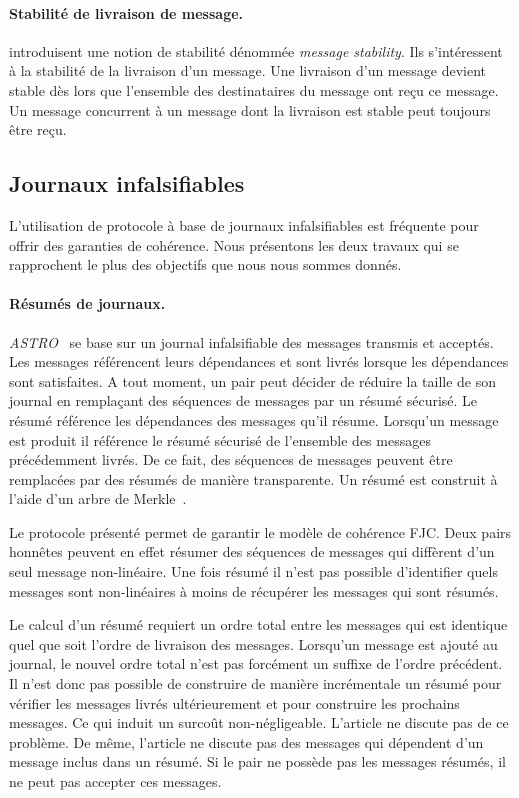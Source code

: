 \paragraph{Stabilité de livraison de message.} \textcite{birman_1991_causalmulticast} introduisent une notion de stabilité dénommée \emph{message stability}.
Ils s'intéressent à la stabilité de  la livraison d'un message.
Une livraison d'un message devient stable dès lors que l'ensemble des destinataires du message ont reçu ce message.
Un message concurrent à un message dont la livraison est stable peut toujours être reçu.


\subsection{Journaux infalsifiables}

L'utilisation de protocole à base de journaux infalsifiables est fréquente pour offrir des garanties de cohérence.
Nous présentons les deux travaux qui se rapprochent le plus des objectifs que nous nous sommes donnés.

\paragraph{Résumés de journaux.} \emph{ASTRO}~\autocite{mahajan_astro_2008} se base sur un journal infalsifiable des messages transmis et acceptés.
Les messages référencent leurs dépendances et sont livrés lorsque les dépendances sont satisfaites.
A tout moment, un pair peut décider de réduire la taille de son journal en remplaçant des séquences de messages par un résumé sécurisé.
Le résumé référence les dépendances des messages qu'il résume.
Lorsqu'un message est produit il référence le résumé sécurisé de l'ensemble des messages précédemment livrés.
De ce fait, des séquences de messages peuvent être remplacées par des résumés de manière transparente.
Un résumé est construit à l'aide d'un arbre de Merkle~\autocite{merkle_1979_merkletree}.

Le protocole présenté permet de garantir le modèle de cohérence \acf{FJC}.
Deux pairs honnêtes peuvent en effet résumer des séquences de messages qui diffèrent d'un seul message non-linéaire.
Une fois résumé il n'est pas possible d'identifier quels messages sont non-linéaires à moins de récupérer les messages qui sont résumés.

Le calcul d'un résumé requiert un ordre total entre les messages qui est identique quel que soit l'ordre de livraison des messages.
Lorsqu'un message est ajouté au journal, le nouvel ordre total n'est pas forcément un suffixe de l'ordre précédent.
Il n'est donc pas possible de construire de manière incrémentale un résumé pour vérifier les messages livrés ultérieurement et pour construire les prochains messages.
Ce qui induit un surcoût non-négligeable.
L'article ne discute pas de ce problème.
De même, l'article ne discute pas des messages qui dépendent d'un message inclus dans un résumé.
Si le pair ne possède pas les messages résumés, il ne peut pas accepter ces messages.

